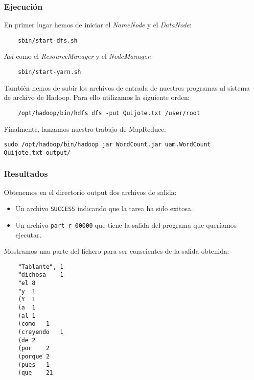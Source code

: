 \documentclass[11pt]{article}
\def\inline{\lstinline[basicstyle=\ttfamily,keywordstyle={}]}
\begin{document}
\subsubsection*{ Ejecución }

En primer lugar hemos de iniciar el \emph{NameNode} y el \emph{DataNode}:

\begin{verbatim}
	sbin/start-dfs.sh
\end{verbatim}

Así como el \emph{ResourceManager} y el \emph{NodeManager}:

\begin{verbatim}
	sbin/start-yarn.sh
\end{verbatim}

También hemos de subir los archivos de entrada de nuestros programas al sistema de archivo de Hadoop. Para ello utilizamos la siguiente orden:

\begin{verbatim}
	/opt/hadoop/bin/hdfs dfs -put Quijote.txt /user/root
\end{verbatim}

Finalmente, lanzamos nuestro trabajo de MapReduce:

\begin{verbatim}
sudo /opt/hadoop/bin/hadoop jar WordCount.jar uam.WordCount Quijote.txt output/
\end{verbatim}

\subsubsection*{ Resultados }

Obtenemos en el directorio output dos archivos de salida:

\begin{itemize}
	\item Un archivo \inline{SUCCESS} indicando que la tarea ha sido exitosa.
	\item Un archivo \inline{part-r-00000} que tiene la salida del programa que queríamos ejecutar.
\end{itemize}

Mostramos una parte del fichero para ser conscientes de la salida obtenida:

\begin{verbatim}
    "Tablante",	1
    "dichosa	1
    "el	8
    "y	1
    (Y	1
    (a	1
    (al	1
    (como	1
    (creyendo	1
    (de	2
    (por	2
    (porque	2
    (pues	1
    (que	21
\end{verbatim}
\end{document}
